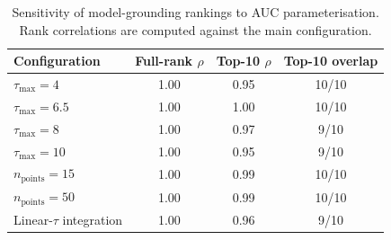 \begin{table}[t]
\centering
\small
\caption{Sensitivity of model-grounding rankings to AUC parameterisation. Rank correlations are computed against the main configuration.}
\label{tab:auc-sensitivity}
\setlength{\tabcolsep}{2pt}
\begin{tabular}{lccc}
\toprule
\textbf{Configuration} & \textbf{Full-rank $\rho$} & \textbf{Top-10 $\rho$} & \textbf{Top-10 overlap} \\
\midrule
$\tau_{\max}=4$ & 1.00 & 0.95 & 10/10 \\
$\tau_{\max}=6.5$ & 1.00 & 1.00 & 10/10 \\
$\tau_{\max}=8$ & 1.00 & 0.97 & 9/10 \\
$\tau_{\max}=10$ & 1.00 & 0.95 & 9/10 \\
$n_{\mathrm{points}}=15$ & 1.00 & 0.99 & 10/10 \\
$n_{\mathrm{points}}=50$ & 1.00 & 0.99 & 10/10 \\
Linear-$\tau$ integration & 1.00 & 0.96 & 9/10 \\
\bottomrule
\end{tabular}
\end{table}
